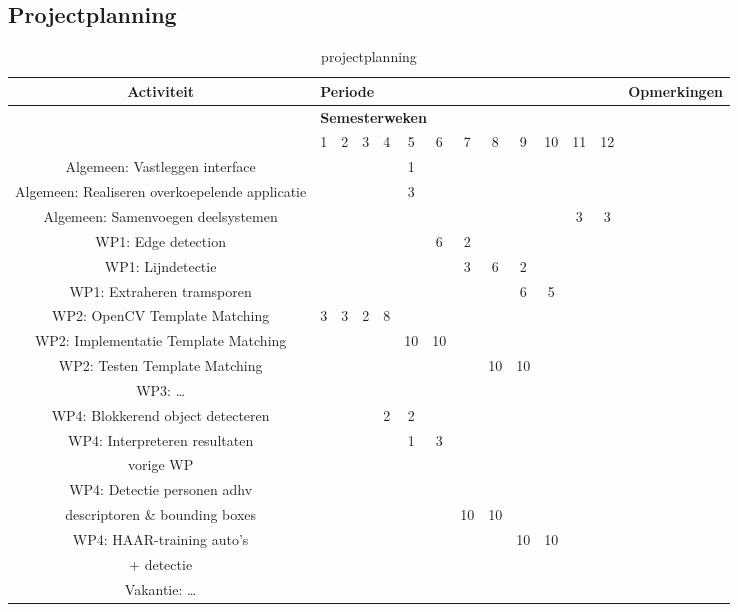 \documentclass[a4paper,oneside,11pt,final]{memoir}
\begin{document}
\subsection{Projectplanning}\label{sec:Projectplanning}


\begin{sidewaystable}[h]
	\centering
		\begin{tabular}{|*{14}{c|}}
		\hline
		\textbf{Activiteit} & \multicolumn{12}{l|}{\textbf{Periode}} & \textbf{Opmerkingen} \\
		\hline
							 & \multicolumn{12}{l|}{\textbf{Semesterweken}} &   \\
		\hline 
		  & 1	& 2	& 3	& 4	& 5	& 6	& 7	& 8	& 9	& 10 & 11	& 12 & \\
		\hline 
		Algemeen: Vastleggen interface & & & & & 1 & & & & & & & & \\
		\hline 
		Algemeen: Realiseren overkoepelende applicatie & & & & & 3 & & & & & & & & \\
		\hline 
		Algemeen: Samenvoegen deelsystemen & & & & & & & & & & & 3 & 3 & \\
		\hline 
		\hline 
		WP1: Edge detection & & & & & & 6 & 2 & & & & & & \\
		\hline 
		WP1: Lijndetectie & & & & & & & 3 & 6 & 2 & & & & \\
		\hline 
		WP1: Extraheren tramsporen & & & & & & & & & 6 & 5 & & & \\
		\hline 
		\hline 
		WP2: OpenCV Template Matching &  3 & 3 & 2 & 8 & & & & & & & & & \\
		\hline 
		WP2: Implementatie Template Matching & & & & &10&10& & & & & & & \\
		\hline 
		WP2: Testen Template Matching & & & & & & & &10&10&& & &\\
		\hline 
		\hline 
		WP3: \ldots & & & & & & & & & & & & & \\
		\hline 
		\hline 
		WP4: Blokkerend object detecteren& & & &2 &2 & & & & & & & & \\
		\hline
		WP4: Interpreteren resultaten & & & & & 1& 3& & & & & & & \\
		vorige WP& & & & & & & & & & & & & \\
		\hline
		WP4: Detectie personen adhv & & & & & & & & & & & & & \\
		 descriptoren \& bounding boxes& & & & & & &10 &10 & & & & & \\
		\hline
		WP4: HAAR-training auto's & & & & & & & & &10 & 10& & & \\
		+ detectie & & & & & & & & & & & & & \\
		\hline 
		Vakantie: \ldots & & & & & & & & & & & & & \\
		\hline
		\end{tabular}
	\caption{projectplanning}
	\label{tab:projectplanning}
\end{sidewaystable}
																							
\end{document}
